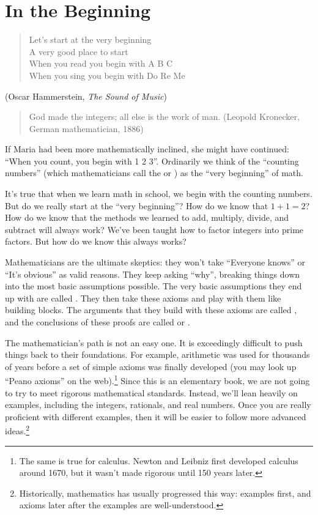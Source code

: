 
\section{In the Beginning\quad
{}}
\begin{verse}
Let's start at the very beginning\\
A very good place to start\\
When you read you begin with A B C\\
When you sing you begin with Do Re Me
\end{verse}

(Oscar Hammerstein, \emph{The Sound of Music})

\begin{quote}
God made the integers; all else is the work of man.
 (Leopold Kronecker, German mathematician, 1886)
\end{quote}
\bigskip

If Maria had been more mathematically inclined, she might have continued:  ``When you count, you begin with 1 2 3''. Ordinarily we think of the ``counting numbers''  (which mathematicians call the  or ) as the ``very beginning'' of math. 

It's true that when we learn math in school, we begin with the counting numbers. But do we really start at the ``very beginning''?   How do we know that $1 + 1 = 2$? How do we know that the methods we learned to add,  multiply, divide, and subtract will always work? We've been taught how to factor integers into prime factors. But how do we know this always works?

 Mathematicians  are the ultimate skeptics: they won't take ``Everyone knows'' or ``It's obvious''  as valid reasons. They keep asking ``why'', breaking things down into the most basic assumptions possible. The very basic assumptions they end up with are called . They then take these axioms and play with them like building blocks. The arguments that they build with these axioms are called , and the conclusions of these proofs are called  or .  

The mathematician's path is not an easy one. It is exceedingly  difficult to push things back to their foundations. For example, arithmetic was used for thousands of years before a set of simple axioms was finally developed (you may look up ``Peano axioms'' on the web).\footnote{The same is true for calculus. Newton and Leibniz first developed calculus around 1670, but it wasn't made rigorous until 150 years later.}
Since this is an elementary book, we are not going to try to meet rigorous mathematical standards. Instead, we'll lean heavily on examples, including the integers, rationals, and real numbers. Once you are really proficient with different examples, then it will be easier to follow more advanced ideas.\footnote{Historically, mathematics has usually progressed this way: examples first, 
and axioms later after the examples are well-understood.}

